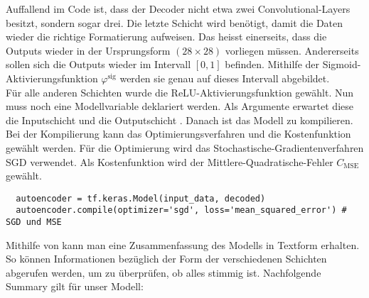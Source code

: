 Auffallend im Code ist, dass der Decoder nicht etwa zwei Convolutional-Layers
besitzt, sondern sogar drei. Die letzte Schicht wird benötigt, damit
die Daten wieder die richtige Formatierung aufweisen. Das heisst einerseits,
dass die Outputs wieder in der Ursprungsform $(28 \times 28)$ vorliegen müssen.
Andererseits sollen sich die Outputs wieder im Intervall
$[0,1]$ befinden. Mithilfe der Sigmoid-Aktivierungsfunktion $\varphi^{\text{sig}}$ werden
sie genau auf dieses Intervall abgebildet. \\
Für alle anderen Schichten wurde die ReLU-Aktivierungsfunktion gewählt.
\para{}
Nun muss noch eine Modellvariable deklariert werden. Als Argumente erwartet
diese die Inputschicht  und die Outputschicht .
Danach ist das Modell zu kompilieren. Bei der Kompilierung kann das
Optimierungsverfahren und die Kostenfunktion gewählt werden. Für die Optimierung
wird das Stochastische-Gradientenverfahren SGD verwendet.
Als Kostenfunktion wird der Mittlere-Quadratische-Fehler $C_{\text{MSE}}$ gewählt.
\begin{verbatim}
  autoencoder = tf.keras.Model(input_data, decoded)
  autoencoder.compile(optimizer='sgd', loss='mean_squared_error') # SGD und MSE
\end{verbatim}
Mithilfe von  kann man eine Zusammenfassung des
Modells in Textform erhalten. So können Informationen bezüglich der Form der
verschiedenen Schichten abgerufen werden, um zu überprüfen, ob alles stimmig ist.
Nachfolgende Summary gilt für unser Modell:

